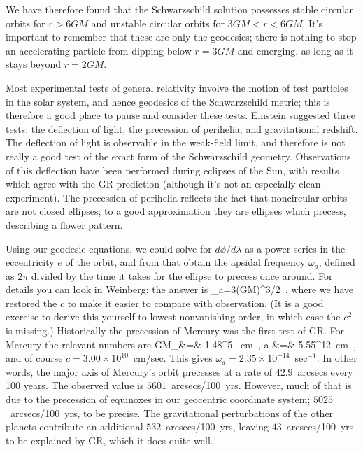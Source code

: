 We have therefore found that the Schwarzschild solution possesses
stable circular orbits for $r>6GM$ and unstable circular orbits for
$3GM < r < 6GM$.  It's important to remember that these are only
the geodesics; there is nothing to stop an accelerating particle from
dipping below $r=3GM$ and emerging, as long as it stays beyond
$r=2GM$.

Most experimental tests of general relativity involve the motion of
test particles in the solar system, and hence geodesics
of the Schwarzschild metric; this is therefore a good place to
pause and consider these tests.  Einstein suggested three tests:
the deflection of light, the precession of perihelia, and gravitational
redshift.  The deflection of light is observable in the weak-field
limit, and therefore is not really a good test of the exact
form of the Schwarzschild geometry.  Observations of this deflection
have been performed during eclipses of the Sun, with results which
agree with the GR prediction (although it's not an especially clean
experiment).  The precession of perihelia reflects
the fact that noncircular orbits are not closed ellipses; to a good
approximation they are ellipses which precess, describing a flower pattern.

\begin{figure}
  \centerline{
  }
\end{figure}

Using our geodesic equations, we could solve for 
$d\phi/d\lambda$ as a power series in the eccentricity $e$ of the
orbit, and from that obtain the apsidal frequency $\omega_a$,
defined as $2\pi$ divided by the time it takes for the ellipse to
precess once around.
For details you can look in Weinberg; the answer is
\be
  \omega_a={{3(GM)^{3/2}}}\ ,\label{7.56}
\ee
where we have restored the $c$ to make it easier to compare with
observation.
(It is a good exercise to derive this yourself to lowest nonvanishing
order, in which case the $e^2$ is missing.)  Historically the
precession of Mercury was the first test of GR.  For Mercury the 
relevant numbers are
\bea
  {{GM_\odot}}&=& 1.48^5 {\rm ~cm}\ ,\cr
  a &=&  5.55^{12}{\rm ~cm}\ ,\label{7.57}
\eea
and of course $c=3.00\times 10^{10}$~cm/sec.  This gives $\omega_a
= 2.35\times 10^{-14}$~sec$^{-1}$.  In other words, the major axis
of Mercury's orbit precesses at a rate of $42.9$~arcsecs every 100
years.  The observed value is $5601$~arcsecs/100~yrs.  However,
much of that is due to the precession of equinoxes in our geocentric
coordinate system; $5025$~arcsecs/100~yrs, to be precise.  The
gravitational perturbations of the other planets contribute an
additional $532$~arcsecs/100~yrs, leaving $43$~arcsecs/100~yrs
to be explained by GR, which it does quite well.

